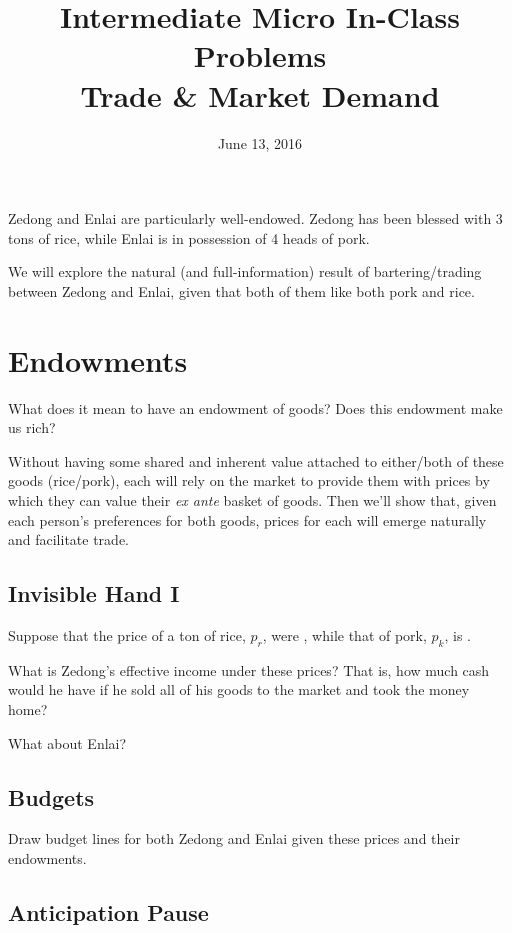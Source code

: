 \documentclass{article}
\begin{document}
\title{Intermediate Micro In-Class Problems \\ \large Trade \& Market Demand}

\date{June 13, 2016}

\maketitle

Zedong and Enlai are particularly well-endowed. Zedong has been blessed with 3 tons of rice, while Enlai is in possession of 4 heads of pork.

We will explore the natural (and full-information) result of bartering/trading between Zedong and Enlai, given that both of them like both pork and rice.

\section{Endowments}

What does it mean to have an endowment of goods? Does this endowment make us rich?

Without having some shared and inherent value attached to either/both of these goods (rice/pork), each will rely on the market to provide them with prices by which they can value their \textit{ex ante} basket of goods. Then we'll show that, given each person's preferences for both goods, prices for each will emerge naturally and facilitate trade.

\subsection{Invisible Hand I}

Suppose that the price of a ton of rice, $p_r$, were , while that of pork, $p_k$, is .

What is Zedong's effective income under these prices? That is, how much cash would he have if he sold all of his goods to the market and took the money home?

What about Enlai?

\subsection{Budgets}

Draw budget lines for both Zedong and Enlai given these prices and their endowments. 

\subsection{Anticipation Pause}
\end{document}
